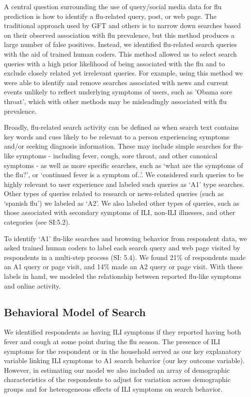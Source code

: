 \documentclass[fleqn,10pt]{wlscirep}
\begin{document}
A central question surrounding the use of query/social media data for flu prediction is how to identify a flu-related query, post, or web page. The traditional approach used by GFT and others is to narrow down searches based on their observed association with flu prevalence, but this method produces a large number of false positives. Instead, we identified flu-related search queries with the aid of trained human coders. This method allowed us to select search queries with a high prior likelihood of being associated with the flu and to exclude closely related yet irrelevant queries. For example, using this method we were able to identify and remove searches associated with news and current events unlikely to reflect underlying symptoms of users, such as 'Obama sore throat', which with other methods may be misleadingly associated with flu prevalence. 

Broadly, flu-related search activity can be defined as when search text contains key words and cues likely to be relevant to a person experiencing symptoms and/or seeking diagnosis information. These may include simple searches for flu-like symptoms - including fever, cough, sore throat, and other canonical symptoms - as well as more specific searches, such as `what are the symptoms of the flu?', or `continued fever is a symptom of..'. We considered such queries to be highly relevant to user experience and labeled such queries as `A1' type searches. Other types of queries related to research or news-related queries (such as `spanish flu') we labeled as `A2'. We also labeled other types of queries, such as those associated with secondary symptoms of ILI, non-ILI illnesses, and other categories (see SI:5.2). 

To identify `A1' flu-like searches and browsing behavior from respondent data, we asked trained human coders to label each search query and web page visited by respondents in a multi-step process (SI: 5.4). We found 21\% of respondents made an A1 query or page visit, and 14\% made an A2 query or page visit. With these labels in hand, we modeled the relationship between reported flu-like symptoms and online activity.

\subsection*{Behavioral Model of Search}

We identified respondents as having ILI symptoms if they reported having both fever and cough at some point during the flu season. The presence of ILI symptoms for the respondent or in the household served as our key explanatory variable linking ILI symptoms to A1 search behavior (our key outcome variable). However, in estimating our model we also included an array of demographic characteristics of the respondents to adjust for variation across demographic groups and for heterogeneous effects of ILI symptoms on search behavior.
\end{document}
